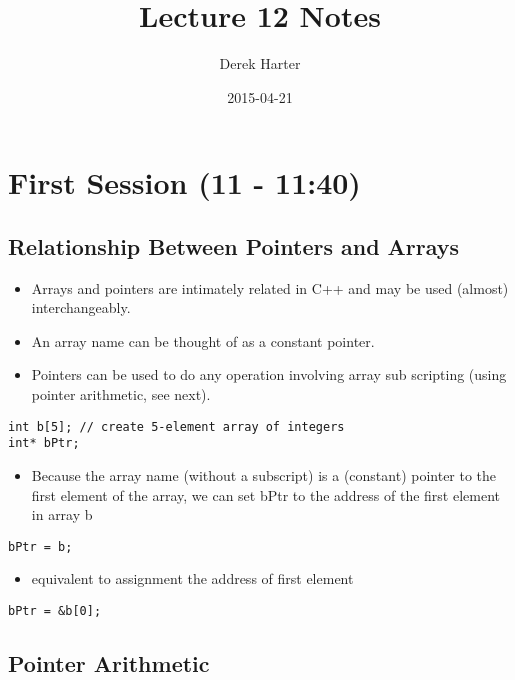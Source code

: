 \documentclass[11pt]{article}
\title{Lecture 12 Notes}
\author{Derek Harter}
\date{2015-04-21}
\begin{document}
\maketitle


\section{First Session (11 - 11:40)}
\label{sec-1}
\subsection{Relationship Between Pointers and Arrays}
\label{sec-1-1}

\begin{itemize}
\item Arrays and pointers are intimately related in C++ and may be used (almost) interchangeably.
\item An array name can be thought of as a constant pointer.
\item Pointers can be used to do any operation involving array sub
  scripting (using pointer arithmetic, see next).
\end{itemize}


\begin{verbatim}
int b[5]; // create 5-element array of integers
int* bPtr;
\end{verbatim}

\begin{itemize}
\item Because the array name (without a subscript) is a (constant) pointer
  to the first element of the array, we can set bPtr to the address of the
  first element in array b
\end{itemize}


\begin{verbatim}
bPtr = b;
\end{verbatim}

\begin{itemize}
\item equivalent to assignment the address of first element
\end{itemize}


\begin{verbatim}
bPtr = &b[0];
\end{verbatim}
\subsection{Pointer Arithmetic}
\label{sec-1-2}
\end{document}

